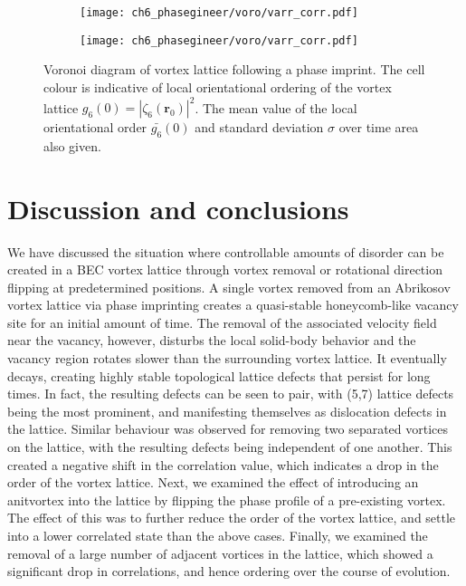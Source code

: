 \begin{figure}\ContinuedFloat\centering
    \begin{subfigure}{0.6\textwidth}
        \texttt{[image: ch6\_phasegineer/voro/varr\_corr.pdf]}
    \end{subfigure}
    \begin{subfigure}{0.6\textwidth}
        \texttt{[image: ch6\_phasegineer/voro/varr\_corr.pdf]}
    \end{subfigure}
    \caption{Voronoi diagram of vortex lattice following a phase imprint. The cell colour is indicative of local orientational ordering of the vortex lattice $g_6(0) = |\zeta_6(\mathbf{r}_0)|^2$. The mean value of the local orientational order $\bar{g_6}(0)$ and standard deviation $\sigma$ over time area also given.}
\end{figure}

\section{Discussion and conclusions}\label{sec:ch6_conc}

We have discussed the situation where controllable amounts of disorder can be created in a BEC vortex lattice through vortex removal or rotational direction flipping at predetermined positions. A single vortex removed from an Abrikosov vortex lattice via phase imprinting creates a quasi-stable honeycomb-like vacancy site for an initial amount of time. The removal of the associated velocity field near the vacancy, however, disturbs the local solid-body behavior and the vacancy region rotates slower than the surrounding vortex lattice. It eventually decays, creating highly stable topological lattice defects that persist for long times. In fact, the resulting defects can be seen to pair, with (5,7) lattice defects being the most prominent, and manifesting themselves as dislocation defects in the lattice. Similar behaviour was observed for removing two separated vortices on the lattice, with the resulting defects being independent of one another. This created a negative shift in the correlation value, which indicates a drop in the order of the vortex lattice. Next, we examined the effect of introducing an anitvortex into the lattice by flipping the phase profile of a pre-existing vortex. The effect of this was to further reduce the order of the vortex lattice, and settle into a lower correlated state than the above cases. Finally, we examined the removal of a large number of adjacent vortices in the lattice, which showed a significant drop in correlations, and hence ordering over the course of evolution.

